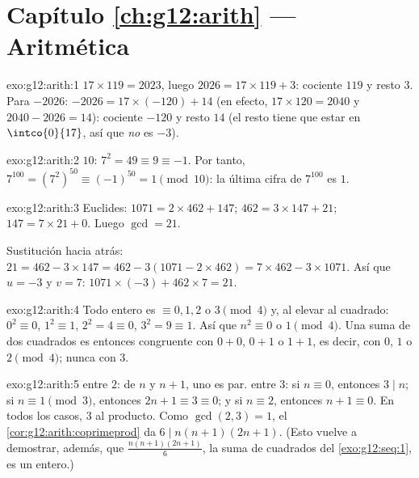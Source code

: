 \section*{Capítulo \ref{ch:g12:arith} --- Aritmética}

\begin{solution}{exo:g12:arith:1}
$17 \times 119 = 2023$, luego $2026 = 17 \times 119 + 3$: cociente $119$ y
resto $3$. Para $-2026$: $-2026 = 17\times(-120) + 14$ (en efecto,
$17 \times 120 = 2040$ y $2040 - 2026 = 14$): cociente $-120$ y resto $14$
(el resto tiene que estar en $\intco{0}{17}$, así que \emph{no} es $-3$).
\end{solution}

\begin{solution}{exo:g12:arith:2}
 $10$: $7^2 = 49 \equiv 9 \equiv -1$. Por tanto,
$7^{100} = \left(7^2\right)^{50} \equiv (-1)^{50} = 1 \pmod{10}$: la última
cifra de $7^{100}$ es $1$.
\end{solution}

\begin{solution}{exo:g12:arith:3}
Euclides: $1071 = 2\times462 + 147$; $462 = 3\times147 + 21$;
$147 = 7\times21 + 0$. Luego $\gcd = 21$.

Sustitución hacia atrás:
$21 = 462 - 3\times147 = 462 - 3(1071 - 2\times462) =
7\times462 - 3\times1071$. Así que $u = -3$ y $v = 7$:
$1071\times(-3) + 462\times7 = 21$.
\end{solution}

\begin{solution}{exo:g12:arith:4}
Todo entero es $\equiv 0, 1, 2$ o $3 \pmod 4$ y, al elevar al cuadrado:
$0^2 \equiv 0$, $1^2 \equiv 1$, $2^2 = 4 \equiv 0$, $3^2 = 9 \equiv 1$. Así
que $n^2 \equiv 0$ o $1 \pmod 4$. Una suma de dos cuadrados es entonces
congruente con $0 + 0$, $0 + 1$ o $1 + 1$, es decir, con $0$, $1$ o
$2 \pmod 4$; nunca con $3$.
\end{solution}

\begin{solution}{exo:g12:arith:5}
 entre $2$: de $n$ y $n + 1$, uno es par.  entre
$3$: si $n \equiv 0$, entonces $3 \mid n$; si $n \equiv 1 \pmod 3$,
entonces $2n + 1 \equiv 3 \equiv 0$; y si $n \equiv 2$, entonces
$n + 1 \equiv 0$. En todos los casos, $3$  al producto. Como
$\gcd(2,3) = 1$, el \cref{cor:g12:arith:coprimeprod} da
$6 \mid n(n+1)(2n+1)$. (Esto vuelve a demostrar, además, que
$\frac{n(n+1)(2n+1)}{6}$, la suma de cuadrados del \cref{exo:g12:seq:1}, es
un entero.)
\end{solution}

